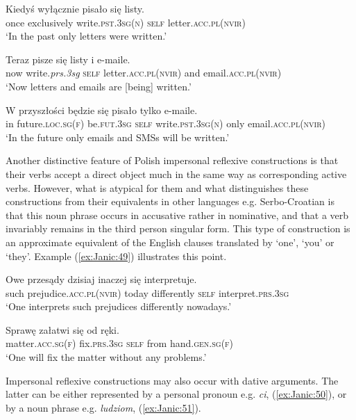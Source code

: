 \documentclass[output=paper]{langscibook}
\begin{document}
\ea \label{ex:Janic:46}
\gll Kiedyś		wyłącznie	 pisało			 się	 listy. \\
 once		exclusively	 write.\textsc{pst.3sg(n)}	\textsc{self}	letter.\textsc{acc.pl(nvir)}	 \\
\glt ‘In the past only letters were written.’
\z 
	
\ea \label{ex:Janic:47}
\gll Teraz	 pisze	 się	 listy			 i	 e-maile. \\
	 now	 write.\textit{prs.3sg}	\textsc{self}	letter.\textsc{acc.pl(nvir)}	and	 email.\textsc{acc.pl(nvir)}\\
\glt ‘Now letters and emails are [being] written.’
\z 

\ea \label{ex:Janic:48}	
\gll W	przyszłości		 będzie		 się	 pisało	 tylko 	e-maile. \\
	 in	future.\textsc{loc.sg(f)}	be.\textsc{fut.3sg}	\textsc{self}	write.\textsc{pst.3sg(n)}	only	email.\textsc{acc.pl(nvir)}\\
\glt ‘In the future only emails and SMSs will be written.’	\citep[428]{Sadowska2012}
\z 
	
Another distinctive feature of Polish impersonal reflexive constructions is that their verbs accept a direct object much in the same way as corresponding active verbs. However, what is atypical for them and what distinguishes these constructions from their equivalents in other languages e.g. Serbo-Croatian is that this noun phrase occurs in accusative rather in nominative, and that a verb invariably remains in the third person singular form. This type of construction is an approximate equivalent of the English clauses translated by ‘one’, ‘you’ or ‘they’. Example (\ref{ex:Janic:49}) illustrates this point.

\ea \label{ex:Janic:49}
\ea \label{ex:Janic:49a}
\gll Owe	 przesądy		 dzisiaj		inaczej		się	 interpretuje.\\
	 such	prejudice.\textsc{acc.pl(nvir)}	today		differently	\textsc{self}	interpret.\textsc{prs.3sg}\\
\glt ‘One interprets such prejudices differently nowadays.’

\ex \label{ex:Janic:49b}
\gll Sprawę		 załatwi	 się	 od	 ręki.\\
	 matter.\textsc{acc.sg(f)}	fix.\textsc{prs.3sg} 	\textsc{self}	from	hand.\textsc{gen.sg(f)}\\
\glt ‘One will fix the matter without any problems.’	 \citep[262, 246]{Siewierska1988}
\z 
\z 
	
Impersonal reflexive constructions may also occur with dative arguments. The latter can be either represented by a personal pronoun e.g. \textit{ci}, (\ref{ex:Janic:50}), or by a noun phrase e.g. \textit{ludziom}, (\ref{ex:Janic:51}). 
\end{document}
